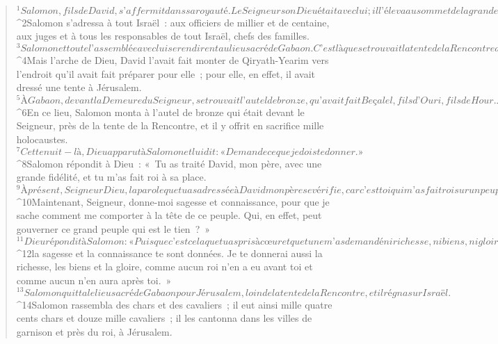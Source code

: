   
  
    
      
         
      \bchapter{}
      \begin{verse}
${}^{1}Salomon, fils de David, s’affermit dans sa royauté. Le Seigneur son Dieu était avec lui ; il l’éleva au sommet de la grandeur.
      
         
${}^{2}Salomon s’adressa à tout Israël : aux officiers de millier et de centaine, aux juges et à tous les responsables de tout Israël, chefs des familles. 
${}^{3}Salomon et toute l’assemblée avec lui se rendirent au lieu sacré de Gabaon. C’est là que se trouvait la tente de la Rencontre de Dieu, celle que Moïse, le serviteur du Seigneur, avait faite dans le désert. 
${}^{4}Mais l’arche de Dieu, David l’avait fait monter de Qiryath-Yearim vers l’endroit qu’il avait fait préparer pour elle ; pour elle, en effet, il avait dressé une tente à Jérusalem. 
${}^{5}À Gabaon, devant la Demeure du Seigneur, se trouvait l’autel de bronze, qu’avait fait Beçalel, fils d’Ouri, fils de Hour. Alors Salomon et l’assemblée consultèrent le Seigneur. 
${}^{6}En ce lieu, Salomon monta à l’autel de bronze qui était devant le Seigneur, près de la tente de la Rencontre, et il y offrit en sacrifice mille holocaustes.
${}^{7}Cette nuit-là, Dieu apparut à Salomon et lui dit : « Demande ce que je dois te donner. » 
${}^{8}Salomon répondit à Dieu : « Tu as traité David, mon père, avec une grande fidélité, et tu m’as fait roi à sa place. 
${}^{9}À présent, Seigneur Dieu, la parole que tu as adressée à David mon père se vérifie, car c’est toi qui m’as fait roi sur un peuple aussi nombreux que la poussière de la terre. 
${}^{10}Maintenant, Seigneur, donne-moi sagesse et connaissance, pour que je sache comment me comporter à la tête de ce peuple. Qui, en effet, peut gouverner ce grand peuple qui est le tien ? » 
${}^{11}Dieu répondit à Salomon : « Puisque c’est cela que tu as pris à cœur et que tu ne m’as demandé ni richesse, ni biens, ni gloire, ni la vie de tes ennemis, puisque tu ne m’as pas demandé non plus de longs jours, mais que tu as demandé pour toi sagesse et connaissance, afin de gouverner mon peuple sur lequel je te fais roi, 
${}^{12}la sagesse et la connaissance te sont données. Je te donnerai aussi la richesse, les biens et la gloire, comme aucun roi n’en a eu avant toi et comme aucun n’en aura après toi. » 
${}^{13}Salomon quitta le lieu sacré de Gabaon pour Jérusalem, loin de la tente de la Rencontre, et il régna sur Israël.
${}^{14}Salomon rassembla des chars et des cavaliers ; il eut ainsi mille quatre cents chars et douze mille cavaliers ; il les cantonna dans les villes de garnison et près du roi, à Jérusalem. 

\end{verse}
